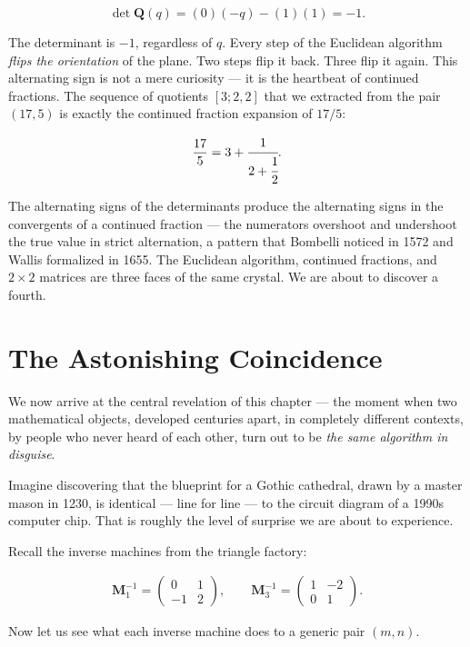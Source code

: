 \documentclass[11pt,twoside,openright]{book}
\theoremstyle{definition}
\theoremstyle{remark}
\begin{document}
\[\det \mathbf{Q}(q) = (0)(- q) - (1)(1) = -1.\]

The determinant is $-1$, regardless of $q$. Every step of the Euclidean algorithm \textit{flips the orientation} of the plane. Two steps flip it back. Three flip it again. This alternating sign is not a mere curiosity --- it is the heartbeat of continued fractions. The sequence of quotients $[3; 2, 2]$ that we extracted from the pair $(17, 5)$ is exactly the continued fraction expansion of $17/5$:

\[\frac{17}{5} = 3 + \cfrac{1}{2 + \cfrac{1}{2}}.\]

The alternating signs of the determinants produce the alternating signs in the convergents of a continued fraction --- the numerators overshoot and undershoot the true value in strict alternation, a pattern that Bombelli noticed in 1572 and Wallis formalized in 1655. The Euclidean algorithm, continued fractions, and $2 \times 2$ matrices are three faces of the same crystal. We are about to discover a fourth.


\section{The Astonishing Coincidence}

We now arrive at the central revelation of this chapter --- the moment when two mathematical objects, developed centuries apart, in completely different contexts, by people who never heard of each other, turn out to be \textit{the same algorithm in disguise}.

Imagine discovering that the blueprint for a Gothic cathedral, drawn by a master mason in 1230, is identical --- line for line --- to the circuit diagram of a 1990s computer chip. That is roughly the level of surprise we are about to experience.

Recall the inverse machines from the triangle factory:

\begin{align*}
\mathbf{M}_1^{-1} = \begin{pmatrix} 0 & 1 \\ -1 & 2 \end{pmatrix}, \qquad
\mathbf{M}_3^{-1} = \begin{pmatrix} 1 & -2 \\ 0 & 1 \end{pmatrix}.
\end{align*}

Now let us see what each inverse machine does to a generic pair $(m, n)$.
\end{document}
